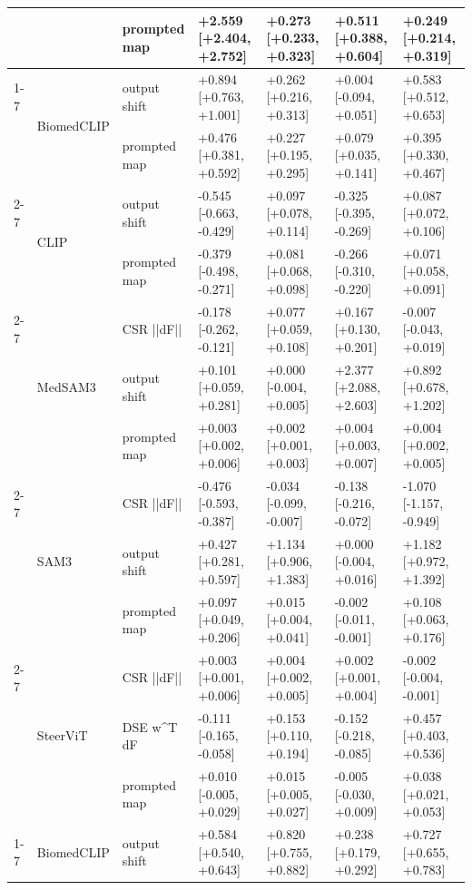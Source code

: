 \begin{tabular}{lllllll}
 &  & prompted map & +2.559 [+2.404, +2.752] & +0.273 [+0.233, +0.323] & +0.511 [+0.388, +0.604] & +0.249 [+0.214, +0.319] \\
\cline{1-7} \cline{2-7}
\multirow[t]{13}{*}{busi} & \multirow[t]{2}{*}{BiomedCLIP} & output shift & +0.894 [+0.763, +1.001] & +0.262 [+0.216, +0.313] & +0.004 [-0.094, +0.051] & +0.583 [+0.512, +0.653] \\
 &  & prompted map & +0.476 [+0.381, +0.592] & +0.227 [+0.195, +0.295] & +0.079 [+0.035, +0.141] & +0.395 [+0.330, +0.467] \\
\cline{2-7}
 & \multirow[t]{2}{*}{CLIP} & output shift & -0.545 [-0.663, -0.429] & +0.097 [+0.078, +0.114] & -0.325 [-0.395, -0.269] & +0.087 [+0.072, +0.106] \\
 &  & prompted map & -0.379 [-0.498, -0.271] & +0.081 [+0.068, +0.098] & -0.266 [-0.310, -0.220] & +0.071 [+0.058, +0.091] \\
\cline{2-7}
 & \multirow[t]{3}{*}{MedSAM3} & CSR  ||dF|| & -0.178 [-0.262, -0.121] & +0.077 [+0.059, +0.108] & +0.167 [+0.130, +0.201] & -0.007 [-0.043, +0.019] \\
 &  & output shift & +0.101 [+0.059, +0.281] & +0.000 [-0.004, +0.005] & +2.377 [+2.088, +2.603] & +0.892 [+0.678, +1.202] \\
 &  & prompted map & +0.003 [+0.002, +0.006] & +0.002 [+0.001, +0.003] & +0.004 [+0.003, +0.007] & +0.004 [+0.002, +0.005] \\
\cline{2-7}
 & \multirow[t]{3}{*}{SAM3} & CSR  ||dF|| & -0.476 [-0.593, -0.387] & -0.034 [-0.099, -0.007] & -0.138 [-0.216, -0.072] & -1.070 [-1.157, -0.949] \\
 &  & output shift & +0.427 [+0.281, +0.597] & +1.134 [+0.906, +1.383] & +0.000 [-0.004, +0.016] & +1.182 [+0.972, +1.392] \\
 &  & prompted map & +0.097 [+0.049, +0.206] & +0.015 [+0.004, +0.041] & -0.002 [-0.011, -0.001] & +0.108 [+0.063, +0.176] \\
\cline{2-7}
 & \multirow[t]{3}{*}{SteerViT} & CSR  ||dF|| & +0.003 [+0.001, +0.006] & +0.004 [+0.002, +0.005] & +0.002 [+0.001, +0.004] & -0.002 [-0.004, -0.001] \\
 &  & DSE  w^T dF & -0.111 [-0.165, -0.058] & +0.153 [+0.110, +0.194] & -0.152 [-0.218, -0.085] & +0.457 [+0.403, +0.536] \\
 &  & prompted map & +0.010 [-0.005, +0.029] & +0.015 [+0.005, +0.027] & -0.005 [-0.030, +0.009] & +0.038 [+0.021, +0.053] \\
\cline{1-7} \cline{2-7}
\multirow[t]{13}{*}{isic} & \multirow[t]{2}{*}{BiomedCLIP} & output shift & +0.584 [+0.540, +0.643] & +0.820 [+0.755, +0.882] & +0.238 [+0.179, +0.292] & +0.727 [+0.655, +0.783] \\

\end{tabular}
